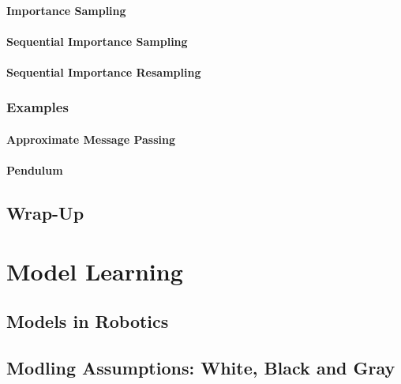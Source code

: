 			\subsubsection{Importance Sampling} %

			\subsubsection{Sequential Importance Sampling} %

			\subsubsection{Sequential Importance Resampling} %

		\subsection{Examples} %

			\subsubsection{Approximate Message Passing} %

			\subsubsection{Pendulum} %

	\section{Wrap-Up} %

\chapter{Model Learning} %

	\section{Models in Robotics} %

	\section{Modling Assumptions: White, Black and Gray} %

